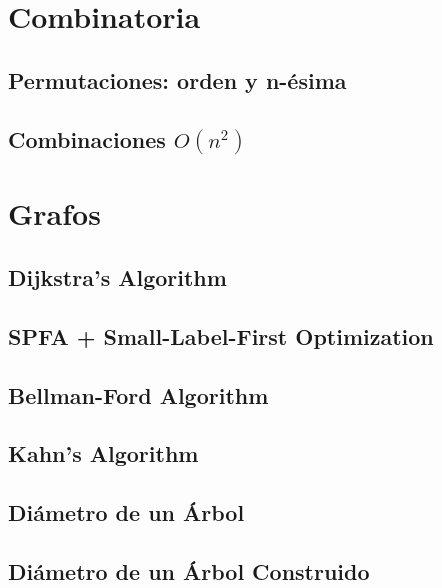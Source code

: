 \section{Combinatoria}
\subsection{Permutaciones: orden y n-\'esima}
\raggedbottom
\hrulefill
\subsection{Combinaciones $O(n^2)$}
\raggedbottom
\hrulefill

\section{Grafos}
\subsection{Dijkstra's Algorithm}
\raggedbottom
\hrulefill
\subsection{SPFA + Small-Label-First Optimization}
\raggedbottom
\hrulefill
\subsection{Bellman-Ford Algorithm}
\raggedbottom
\hrulefill
\subsection{Kahn's Algorithm}
\raggedbottom
\hrulefill
\subsection{Di\'ametro de un \'Arbol}
\raggedbottom
\hrulefill
\subsection{Di\'ametro de un \'Arbol Construido}
\raggedbottom
\hrulefill
